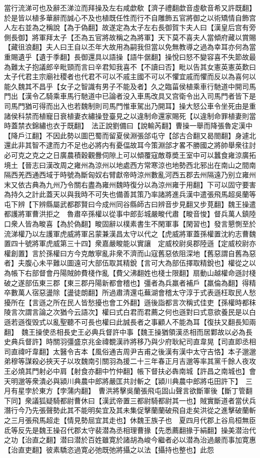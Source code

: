 當行流涕可也及辭丕涕泣而拜操及左右咸歔欷【濟子禮翻歔音虛欷音希又許既翻】於是皆以植多華辭而誠心不及也植既任性而行不自雕飾五官將御之以術矯情自飾宫人左右並為之稱說【為于偽翻】故遂定為太子左右長御賀卞夫人曰【漢皇后宫有旁側長御】將軍拜太子【丕為五官將故稱之為將軍】天下莫不喜夫人當傾府藏以賞賜【藏徂浪翻】夫人曰王自以丕年大故用為嗣我但當以免無教導之過為幸耳亦何為當重賜遺乎【遺于季翻】長御還具以語操【語牛倨翻】操悅曰怒不變容喜不失節故最為難太子抱議郎辛毗頸而言曰辛君知我喜不【不讀曰否】毗以告其女憲英憲英歎曰太子代君主宗廟社稷者也代君不可以不戚主國不可以不懼宜戚而懼而反以為喜何以能久魏其不昌乎【女子之智識有男子不能及者】久之臨菑侯植乘車行馳道中開司馬門出【漢令乙騎乘車馬行馳道中已論者没入車馬改具又宫衛令出入司馬門者皆下是司馬門猶可得而出入也若魏制則司馬門惟車駕出乃開耳】操大怒公車令坐死由是重諸侯科禁而植寵日衰植妻衣繡操登臺見之以違制命還家賜死【以違制命罪植妻則當時蓋禁衣錦繡也衣于既翻】　法正說劉備曰【說輸芮翻】曹操一舉而降張魯定漢中【降戶江翻】不因此勢以圖巴蜀而留夏侯淵張郃屯守【郃古合翻又曷閤翻】身遽北還此非其智不逮而力不足也必將内有憂偪故耳今策淵郃才畧不勝國之將帥舉衆往討必可克之克之之日廣農積穀觀釁伺隙上可以傾覆寇敵尊奬王室中可以蠶食雍涼廣拓境土【晉志曰漢改周之雍州為涼州以地處西方常寒涼也地勢西北邪出在南山之間南隔西羌西通西域于時號為斷匈奴右臂獻帝時涼州數亂河西五郡去州隔遠乃别立雍州末又依古典為九州乃令關右盡為雍州魏時復分以為涼州雍于用翻】下可以固守要害為持久之計此蓋天以與我時不可失也備善其策乃率諸將進兵漢中遣張飛馬超吳蘭等屯下辨【下辨縣屬武都郡賢曰今成州同谷縣師古曰辨音步見翻又步莧翻】魏王操遣都護將軍曹洪拒之　魯肅卒孫權以從事中郎彭城嚴畯代肅【畯音悛】督兵萬人鎮陸口衆人皆為畯喜【為於偽翻】畯固辭以樸素書生不閑軍事【閑習也】發言懇惻至於流涕權乃以左護軍虎威將軍呂蒙兼漢昌太守以代之【虎威將軍蓋孫權置沈約志曹魏置四十號將軍虎威第三十四】衆嘉嚴畯能以實讓　定威校尉吳郡陸遜【定威校尉亦權創置】言於孫權曰方今克敵寧亂非衆不濟而山寇舊惡依阻深地【舊惡謂自舊為惡者】夫腹心未平難以圖遠可大部伍取其精銳【言可大為部伍擇取精銳也】權從之以為帳下右部督會丹陽賊帥費棧作亂【費父沸翻姓也棧士限翻】扇動山越權命遜討棧破之遂部伍東三郡【東三郡丹陽新都會稽也】彊者為兵羸者補戶【羸倫為翻】得精卒數萬人宿惡盪除【盪徒朗翻】所過肅清還屯蕪湖會稽太守淳于式表遜枉取民人愁擾所在【言遜之所在民人皆愁擾也會工外翻】遜後詣都言次稱式佳吏【孫權時都秣陵言次謂言論之次猶今云語次】權曰式白君而君薦之何也遜對曰式意欲養民是以白遜若遜復毁式以亂聖聽不可長也權曰此誠長者之事顧人不能為耳【復扶又翻長知兩翻】　魏王操使丞相長史王必典兵督許中事【魏王操猶領漢丞相而居鄴故以必為長史典兵督許】時關羽彊盛京兆金禕覩漢祚將移乃與少府耿紀司直韋晃【司直即丞相司直禕吁韋翻】太醫令吉本【風俗通吉周尹吉甫之後漢有漢中太守吉恪】本子邈邈弟穆等謀殺必挾天子以攻魏南引關羽為援二十三年春正月吉邈等率其黨千餘人夜攻王必燒其門射必中肩【射食亦翻中竹仲翻】帳下督扶必犇南城【許昌之南城也】會天明邈等衆潰必與潁川典農中郎將嚴匡共討斬之【潁川典農中郎將屯田許下】　三月有星孛於東方【孛蒲内翻】　曹洪將擊吳蘭張飛屯固山聲言欲斷軍後【斷丁管翻下同】衆議狐疑騎都尉曹休曰【漢武帝置三都尉騎都尉其一也】賊實斷道者當伏兵潛行今乃先張聲勢此其不能明矣宜及其未集促擊蘭蘭破飛自走矣洪從之進擊破蘭斬之三月張飛馬超走【情見勢屈宜其走也】休魏王族子也　夏四月代郡上谷烏桓無臣氐等反先是魏王操召代郡太守裴潜為丞相理曹掾【先悉薦翻掾于絹翻】操美潜治代之功【治直之翻】潜曰潜於百姓雖寛於諸胡為峻今繼者必以潜為治過嚴而事加寛惠【治直吏翻】彼素驕恣過寛必弛既弛將攝之以法【攝持也整也】此怨